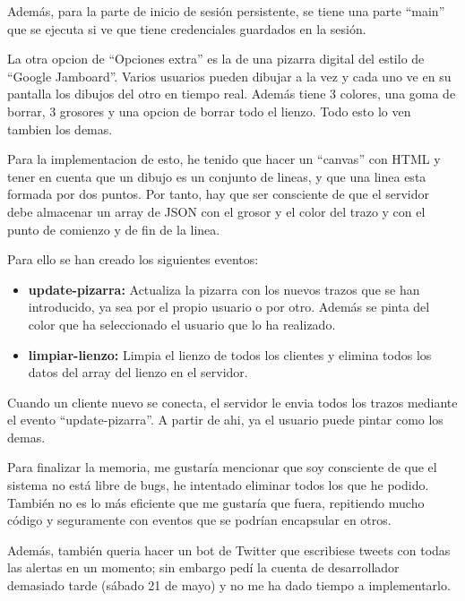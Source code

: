 \documentclass{article}
\begin{document}
Además, para la parte de inicio de sesión persistente, se tiene una parte ``main'' que se ejecuta si ve que tiene credenciales guardados en la sesión.


La otra opcion de ``Opciones extra'' es la de una pizarra digital del estilo de ``Google Jamboard''. Varios usuarios pueden dibujar a la vez y cada uno ve en su pantalla los dibujos del otro en tiempo real. Además tiene 3 colores, una goma de borrar, 3 grosores y una opcion de borrar todo el lienzo. Todo esto lo ven tambien los demas.

Para la implementacion de esto, he tenido que hacer un ``canvas'' con HTML y tener en cuenta que un dibujo es un conjunto de lineas, y que una linea esta formada por dos puntos. Por tanto, hay que ser consciente de que el servidor debe almacenar un array de JSON con el grosor y el color del trazo y con el punto de comienzo y de fin de la linea.


Para ello se han creado los siguientes eventos:

\begin{itemize}
    \item \textbf{update-pizarra: }Actualiza la pizarra con los nuevos trazos que se han introducido, ya sea por el propio usuario o por otro. Además se pinta del color que ha seleccionado el usuario que lo ha realizado.
    \item \textbf{limpiar-lienzo: }Limpia el lienzo de todos los clientes y elimina todos los datos del array del lienzo en el servidor.
\end{itemize}

Cuando un cliente nuevo se conecta, el servidor le envia todos los trazos mediante el evento ``update-pizarra''. A partir de ahi, ya el usuario puede pintar como los demas.


Para finalizar la memoria, me gustaría mencionar que soy consciente de que el sistema no está libre de bugs, he intentado eliminar todos los que he podido. También no es lo más eficiente que me gustaría que fuera, repitiendo mucho código y seguramente con eventos que se podrían encapsular en otros.

Además, también queria hacer un bot de Twitter que escribiese tweets con todas las alertas en un momento; sin embargo pedí la cuenta de desarrollador demasiado tarde (sábado 21 de mayo) y no me ha dado tiempo a implementarlo.
\end{document}
